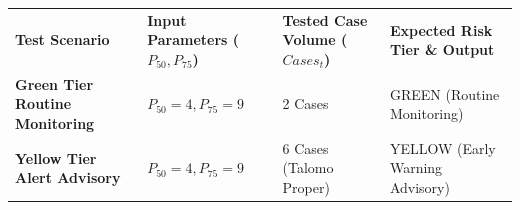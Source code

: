 \documentclass[
]{article}
\newcounter{none} %
\begin{document}
{\def\LTcaptype{none} %
\begin{longtable}[]{@{}
  >{\raggedright\arraybackslash}p{}
  >{\raggedright\arraybackslash}p{}
  >{\raggedright\arraybackslash}p{}
  >{\raggedright\arraybackslash}p{}@{}}
\toprule\noalign{}
\begin{minipage}[b]{\linewidth}\raggedright
\textbf{Test Scenario}
\end{minipage} & \begin{minipage}[b]{\linewidth}\raggedright
\textbf{Input Parameters (}\(P_{50},P_{75}\)\textbf{)}
\end{minipage} & \begin{minipage}[b]{\linewidth}\raggedright
\textbf{Tested Case Volume (}\(Cases_{t}\)\textbf{)}
\end{minipage} & \begin{minipage}[b]{\linewidth}\raggedright
\textbf{Expected Risk Tier \& Output}
\end{minipage} \\
\begin{minipage}[b]{\linewidth}\raggedright
\textbf{Green Tier Routine Monitoring}
\end{minipage} & \begin{minipage}[b]{\linewidth}\raggedright
\(P_{50} = 4,P_{75} = 9\)
\end{minipage} & \begin{minipage}[b]{\linewidth}\raggedright
2 Cases
\end{minipage} & \begin{minipage}[b]{\linewidth}\raggedright
GREEN (Routine Monitoring)
\end{minipage} \\
\begin{minipage}[b]{\linewidth}\raggedright
\textbf{Yellow Tier Alert Advisory}
\end{minipage} & \begin{minipage}[b]{\linewidth}\raggedright
\(P_{50} = 4,P_{75} = 9\)
\end{minipage} & \begin{minipage}[b]{\linewidth}\raggedright
6 Cases (Talomo Proper)
\end{minipage} & \begin{minipage}[b]{\linewidth}\raggedright
YELLOW (Early Warning Advisory)
\end{minipage} \\

\end{longtable}}
\end{document}
